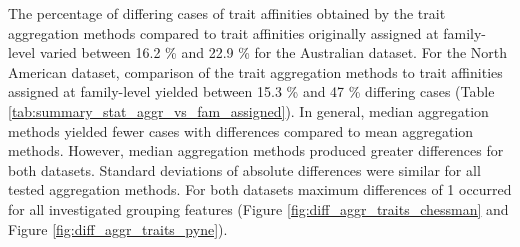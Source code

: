 \documentclass{article}
\begin{document}
The percentage of differing cases of trait affinities obtained by the trait aggregation methods compared to trait affinities originally assigned at family-level varied between 16.2 \% and 22.9 \% for the Australian dataset. For the North American dataset, comparison of the trait aggregation methods to trait affinities assigned at family-level yielded between 15.3 \% and 47 \% differing cases (Table \ref{tab:summary_stat_aggr_vs_fam_assigned}). In general, median aggregation methods yielded fewer cases with differences compared to mean aggregation methods. However, median aggregation methods produced greater differences for both datasets. Standard deviations of absolute differences were similar for all tested aggregation methods. For both datasets maximum differences of 1 occurred for all investigated grouping features (Figure \ref{fig:diff_aggr_traits_chessman} and Figure \ref{fig:diff_aggr_traits_pyne}).

\end{document}
